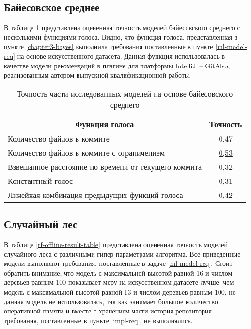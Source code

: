     \subsection{Байесовское среднее}\label{bayes-quality-offline}
В таблице \ref{bayes-offline-result-table} представлена оцененная точность моделей байесовского среднего с несколькими функциями голоса. Видно, что функция голоса, представленная в пункте \ref{chapter3-bayes} выполнила требования поставленные в пункте \ref{ml-model-req} на основе искусственного датасета. Данная функция использовалась в качестве модели рекомендаций в плагине для платформы IntelliJ~-- GitAlso, реализованным автором выпускной квалификационной работы.
        \begin{table}[!h]   
        \caption{Точность части исследованных моделей на основе байесовского среднего}\label{bayes-offline-result-table}
        \centering
        \begin{tabular}{|l|c|}\hline
        \multicolumn{1}{|c|}{\textbf{Функция голоса}} & \textbf{Точность}\\\hline
        Количество файлов в коммите & 0,47\\\hline
        Количество файлов в коммите с ограничением  & \uline{0,53} \\\hline
        Взвешанное расстояние по времени от текущего коммита  & 0,32\\\hline
        Константный голос  & 0,31\\\hline
        Линейная комбинация предыдущих функций голоса  & 0,42\\\hline
        \end{tabular}
        \end{table}
    \subsection{Случайный лес}\label{forest-quality-offline}
В таблице \ref{rf-offline-result-table} представлена оцененная точность моделей случайного леса с различными гипер-параметрами алгоритма. Все приведенные модели выполняют требования, поставленные в задаче \ref{ml-model-req}. Стоит обратить внимание, что модель с максимальной высотой равной 16 и числом деревьев равным 100 показывает меру на искусственном датасете лучше, чем модель с максимальной высотой равной 13 и числом деревьев равным 100, но данная модель не использовалась, так как занимает большое количество оперативной памяти и вместе с хранением части история репозитория требования, поставленные в пункте \ref{impl-req}, не выполнялись. 

